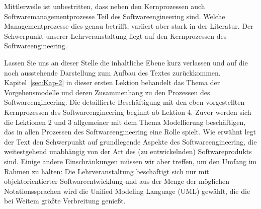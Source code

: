 Mittlerweile ist unbestritten, dass neben den Kernprozessen auch Softwaremanagementprozesse Teil des Softwareengineering sind. Welche Managementprozesse dies genau betrifft, variiert aber stark in der Literatur. Der Schwerpunkt unserer Lehrveranstaltung liegt auf den Kernprozessen des Softwareengineering. 


Lassen Sie uns an dieser Stelle die inhaltliche Ebene kurz verlassen und auf die noch ausstehende Darstellung zum Aufbau des Textes zurückkommen. Kapitel~\ref{sec:Kap-2} in dieser ersten Lektion behandelt das Thema der Vorgehensmodelle und deren Zusammenhang zu den Prozessen des Softwareengineering. Die detaillierte Beschäftigung mit den eben vorgestellten Kernprozessen des Softwareengineering beginnt ab Lektion 4. Zuvor werden sich die Lektionen 2 und 3 allgemeiner mit dem Thema Modellierung beschäftigen, das in allen Prozessen des Softwareengineering eine Rolle spielt. Wie erwähnt legt der Text den Schwerpunkt auf grundlegende Aspekte des Softwareengineering, die weitestgehend unabhängig von der Art des (zu entwickelnden) Softwareprodukts sind. Einige andere Einschränkungen müssen wir aber treffen, um den Umfang im Rahmen zu halten: Die Lehrveranstaltung beschäftigt sich nur mit objektorientierter Softwareentwicklung und aus der Menge der möglichen Notationssprachen wird die Unified Modeling Language (UML) gewählt, die die bei Weitem größte Verbreitung genießt.  